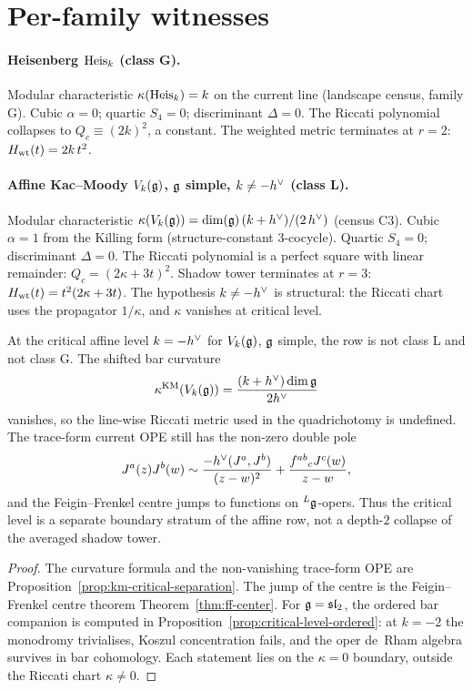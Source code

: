 \section{Per-family witnesses}
\label{sec:per-family-witnesses}

\paragraph{Heisenberg $\mathrm{Heis}_k$ (class G).}
Modular characteristic $\kappa(\mathrm{Heis}_k) = k$ on the current line
(landscape census, family G). Cubic $\alpha = 0$; quartic $S_4 = 0$;
discriminant $\Delta = 0$. The Riccati polynomial collapses to
$Q_c \equiv (2 k)^{2}$, a constant. The weighted metric terminates at
$r=2$: $H_{\rm wt}(t)=2k\,t^2$.

\paragraph{Affine Kac--Moody $V_k(\mathfrak{g})$, $\mathfrak{g}$ simple, $k \neq -h^{\vee}$ (class L).}
Modular characteristic $\kappa(V_k(\mathfrak{g})) = \dim(\mathfrak{g})\,(k + h^{\vee}) /
(2\,h^{\vee})$ (census C3). Cubic $\alpha = 1$ from the Killing form
(structure-constant $3$-cocycle). Quartic $S_4 = 0$; discriminant
$\Delta = 0$. The Riccati polynomial is a perfect square with linear
remainder: $Q_c = (2\kappa + 3 t)^{2}$. Shadow tower terminates at
$r = 3$: $H_{\rm wt}(t) = t^{2}(2\kappa + 3 t)$. The hypothesis
$k\ne-h^{\vee}$ is structural: the Riccati chart uses the propagator
$1/\kappa$, and $\kappa$ vanishes at critical level.

\begin{proposition}
\label{prop:critical-ff-companion-shadow}
\ClaimStatusProvedElsewhere
At the critical affine level $k=-h^{\vee}$ for $V_k(\mathfrak{g})$, $\mathfrak{g}$ simple,
the row is not class L and not class G. The shifted bar curvature
\[
\kappa^{\mathrm{KM}}(V_k(\mathfrak{g}))
=\frac{(k+h^{\vee})\dim\mathfrak{g}}{2h^{\vee}}
\]
vanishes, so the line-wise Riccati metric used in
the quadrichotomy is undefined. The trace-form current
OPE still has the non-zero double pole
\[
J^a(z)J^b(w)\sim
\frac{-h^{\vee}(J^a,J^b)}{(z-w)^2}
+\frac{f^{ab}{}_{c}J^c(w)}{z-w},
\]
and the Feigin--Frenkel centre jumps to functions on
${}^L\mathfrak{g}$-opers. Thus the critical level is a separate boundary
stratum of the affine row, not a depth-$2$ collapse of the averaged
shadow tower.
\end{proposition}

\begin{proof}
The curvature formula and the non-vanishing trace-form OPE are
Proposition~\ref{prop:km-critical-separation}. The jump of the centre
is the Feigin--Frenkel centre theorem
Theorem~\ref{thm:ff-center}. For $\mathfrak{g}=\mathfrak{sl}_2$, the ordered
bar companion is computed in
Proposition~\ref{prop:critical-level-ordered}: at $k=-2$ the
monodromy trivialises, Koszul concentration fails, and the oper
de~Rham algebra survives in bar cohomology. Each statement lies on
the $\kappa=0$ boundary, outside the Riccati chart
$\kappa\ne0$.
\end{proof}

